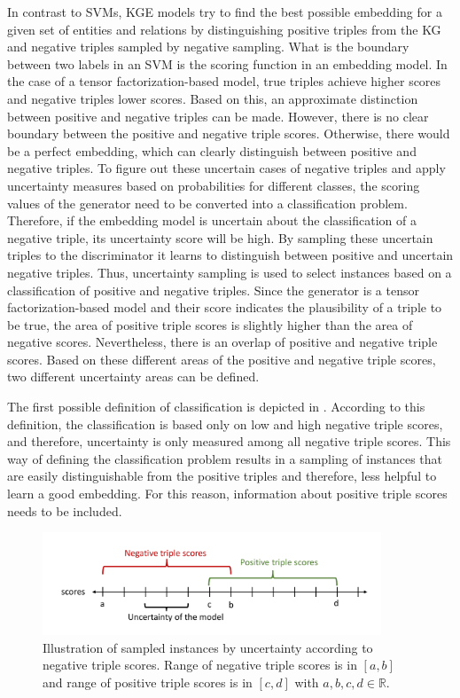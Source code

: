 In contrast to \acp{SVM}, \ac{KGE} models try to find the best possible embedding for a given set of entities and relations by distinguishing positive triples from the \ac{KG} and negative triples sampled by negative sampling.
What is the boundary between two labels in an \ac{SVM} is the scoring function in an embedding model.
In the case of a tensor factorization-based model, true triples achieve higher scores and negative triples lower scores.
Based on this, an approximate distinction between positive and negative triples can be made.
However, there is no clear boundary between the positive and negative triple scores.
Otherwise, there would be a perfect embedding, which can clearly distinguish between positive and negative triples.
To figure out these uncertain cases of negative triples and apply uncertainty measures based on probabilities for different classes, the scoring values of the generator need to be converted into a classification problem.
Therefore, if the embedding model is uncertain about the classification of a negative triple, its uncertainty score will be high.
By sampling these uncertain triples to the discriminator it learns to distinguish between positive and uncertain negative triples.
Thus, uncertainty sampling is used to select instances based on a classification of positive and negative triples.
Since the generator is a tensor factorization-based model and their score indicates the plausibility of a triple to be true, the area of positive triple scores is slightly higher than the area of negative scores.
Nevertheless, there is an overlap of positive and negative triple scores.
Based on these different areas of the positive and negative triple scores, two different uncertainty areas can be defined.

The first possible definition of classification is depicted in .
According to this definition, the classification is based only on low and high negative triple scores, and therefore, uncertainty is only measured among all negative triple scores.
This way of defining the classification problem results in a sampling of instances that are easily distinguishable from the positive triples and therefore, less helpful to learn a good embedding.
For this reason, information about positive triple scores needs to be included.
\clearpage
\begin{figure}[H]
  \centering
    \includegraphics[width=0.9\textwidth]{figures/badVsGoodApproach.pdf}
  \caption{Illustration of sampled instances by uncertainty according to negative triple scores.
  Range of negative triple scores is in $[a, b]$ and range of positive triple scores is in  $[c, d]$ with $a,b,c,d \in \mathbb{R}$.}
  \label{fig:badVsGoodApproach}
\end{figure}

